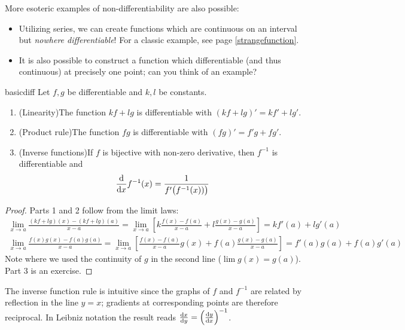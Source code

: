 More esoteric examples of non-differentiability are also possible:
\begin{itemize}
  \item Utilizing series, we can create functions which are continuous on an interval but \emph{nowhere differentiable}! For a classic example, see page \ref{strangefunction}.
  \item It is also possible to construct a function which differentiable (and thus continuous) at precisely one point; can you think of an example?
\end{itemize}

\goodbreak


	
\begin{thm}{}{basicdiff}
Let $f,g$ be differentiable and $k,l$ be constants.
\begin{enumerate}
  \item (Linearity)\quad The function $kf+lg$ is differentiable with $(kf+lg)'=kf'+lg'$.
  \item (Product rule)\quad The function $fg$ is differentiable with $(fg)'=f'g+fg'$.
  \item (Inverse functions)\quad If $f$ is bijective with non-zero derivative, then $f^{-1}$ is differentiable and
	\[\diff xf^{-1}(x)=\frac 1{f'\big(f^{-1}(x))\big)}\] 
\end{enumerate}
\end{thm}

\begin{proof}
Parts 1 and 2 follow from the limit laws:
\begin{gather*}
\lim_{x\to a}\frac{(kf+lg)(x)-(kf+lg)(a)}{x-a}=\lim_{x\to a}\left[k\frac{f(x)-f(a)}{x-a}+l\frac{g(x)-g(a)}{x-a}\right]=kf'(a)+lg'(a)\\
\lim_{x\to a}\frac{f(x)g(x)-f(a)g(a)}{x-a}=\lim_{x\to a}\left[\frac{f(x)-f(a)}{x-a}g(x)+f(a)\frac{g(x)-g(a)}{x-a}\right]=f'(a)g(a)+f(a)g'(a)
\end{gather*}
Note where we used the continuity of $g$ in the second line ($\lim g(x)=g(a)$). Part 3 is an exercise.
\end{proof}

The inverse function rule is intuitive since the graphs of $f$ and $f^{-1}$ are related by reflection in the line $y=x$; gradients at corresponding points are therefore reciprocal. In Leibniz notation the result reads $\diff[x]{y}=\left(\diff[y]{x}\right)^{-1}$.

